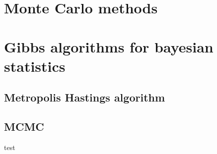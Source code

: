 \documentclass{article}\usepackage[]{graphicx}\usepackage[]{xcolor}
\begin{document}
\section{Monte Carlo methods}

\section{Gibbs algorithms for bayesian statistics}

\subsection{Metropolis Hastings algorithm}

\subsection{MCMC}


\newpage
test


\end{document}
